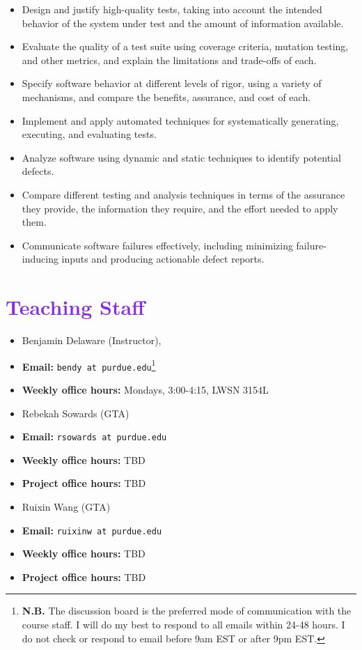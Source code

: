 \documentclass[letterpaper,11pt]{article}
\begin{document}
\begin{itemize}
\item Design and justify high-quality tests, taking into account the
  intended behavior of the system under test and the amount of
  information available.
\item Evaluate the quality of a test suite using coverage criteria,
  mutation testing, and other metrics, and explain the limitations and
  trade-offs of each.
\item Specify software behavior at different levels of rigor, using a
  variety of mechanisms, and compare the benefits, assurance, and cost
  of each.
\item Implement and apply automated techniques for systematically
  generating, executing, and evaluating tests.
\item Analyze software using dynamic and static techniques to identify
  potential defects.
\item Compare different testing and analysis techniques in terms of
  the assurance they provide, the information they require, and the
  effort needed to apply them.
\item Communicate software failures effectively, including minimizing
  failure-inducing inputs and producing actionable defect reports.
\end{itemize}

\section*{\textcolor{BlueViolet}{Teaching Staff}}

\begin{itemize}
\item Benjamin Delaware (Instructor),
\item[ ] \textbf{Email:} \texttt{bendy at
    purdue.edu}\footnote{\textbf{N.B.} The discussion board is the
    preferred mode of communication with the course staff. I will do
    my best to respond to all emails within 24-48 hours. I do not
    check or respond to email before 9am EST or after 9pm EST.}
\item[ ] \textbf{Weekly office hours:} Mondays, 3:00-4:15, LWSN 3154L
  \\[-8pt]

  \item Rebekah Sowards (GTA)
\item[ ] \textbf{Email:} \texttt{rsowards at purdue.edu}
\item[ ] \textbf{Weekly office hours:} TBD
\item[ ] \textbf{Project office hours:} TBD
  \\[-8pt]


\item Ruixin Wang (GTA)
\item[ ] \textbf{Email:} \texttt{ruixinw at purdue.edu}
\item[ ] \textbf{Weekly office hours:} TBD
\item[ ] \textbf{Project office hours:} TBD

\end{itemize}
\end{document}
